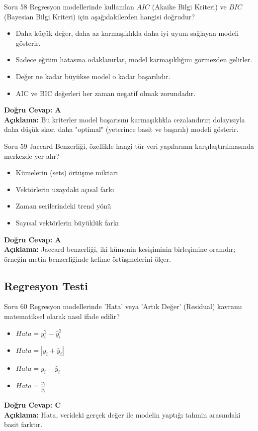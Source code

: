 \documentclass[12pt,a4paper]{article}
\begin{document}
\begin{testcard}{Soru 58}
    Regresyon modellerinde kullanılan $AIC$ (Akaike Bilgi Kriteri) ve $BIC$ (Bayesian Bilgi Kriteri) için aşağıdakilerden hangisi doğrudur?
    \begin{itemize}
        \item[A)] Daha küçük değer, daha az karmaşıklıkla daha iyi uyum sağlayan modeli gösterir.
        \item[B)] Sadece eğitim hatasına odaklanırlar, model karmaşıklığını görmezden gelirler.
        \item[C)] Değer ne kadar büyükse model o kadar başarılıdır.
        \item[D)] AIC ve BIC değerleri her zaman negatif olmak zorundadır.
    \end{itemize}
    \tcblower
    \textbf{Doğru Cevap: A} \\
    \textbf{Açıklama:} Bu kriterler model başarısını karmaşıklıkla cezalandırır; dolayısıyla daha düşük skor, daha "optimal" (yeterince basit ve başarılı) modeli gösterir.
\end{testcard}

\begin{testcard}{Soru 59}
    Jaccard Benzerliği, özellikle hangi tür veri yapılarının karşılaştırılmasında merkezde yer alır?
    \begin{itemize}
        \item[A)] Kümelerin (sets) örtüşme miktarı
        \item[B)] Vektörlerin uzaydaki açısal farkı
        \item[C)] Zaman serilerindeki trend yönü
        \item[D)] Sayısal vektörlerin büyüklük farkı
    \end{itemize}
    \tcblower
    \textbf{Doğru Cevap: A} \\
    \textbf{Açıklama:} Jaccard benzerliği, iki kümenin kesişiminin birleşimine oranıdır; örneğin metin benzerliğinde kelime örtüşmelerini ölçer.
\end{testcard}

\newpage
\subsection{Regresyon Testi}

\begin{testcard}{Soru 60}
    Regresyon modellerinde 'Hata' veya 'Artık Değer' (Residual) kavramı matematiksel olarak nasıl ifade edilir?
    \begin{itemize}
        \item[A)] $Hata = y_i^2 - \hat{y}_i^2$
        \item[B)] $Hata = |y_i + \hat{y}_i|$
        \item[C)] $Hata = y_i - \hat{y}_i$
        \item[D)] $Hata = \frac{y_i}{\hat{y}_i}$
    \end{itemize}
    \tcblower
    \textbf{Doğru Cevap: C} \\
    \textbf{Açıklama:} Hata, verideki gerçek değer ile modelin yaptığı tahmin arasındaki basit farktır.
\end{testcard}
\end{document}
